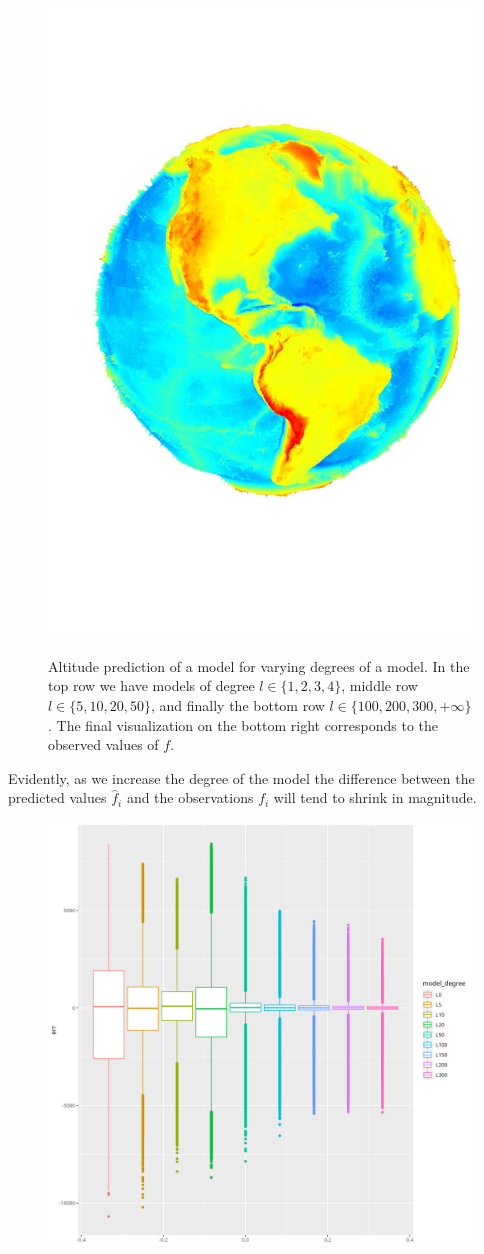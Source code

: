 \documentclass[a4paper]{article}
\theoremstyle{definition}
\begin{document}
\begin{figure}[h!]
\begin{minipage}{.245\textwidth}
        \includegraphics[width=0.95\linewidth]{media/med.jpg}
        \label{fig:med}
    \end{minipage}
    \caption{Altitude prediction of a model for varying degrees of a model. In the top row we have models of degree $l \in \{1, 2, 3, 4\}$, middle row $l \in \{5, 10, 20, 50\}$, and finally the bottom
    row $l \in \{100, 200, 300, +\infty\}$. The final visualization on the bottom right corresponds to the observed values of $f$.}
\end{figure}

Evidently, as we increase the degree of the model the difference between the predicted values $\hat f_i$ and the observations $f_i$ will tend to 
shrink in magnitude.

\begin{figure}
    \centering
    \includegraphics[width=0.5\linewidth]{media/boxplot_hi.png}
\end{figure}
\end{document}
